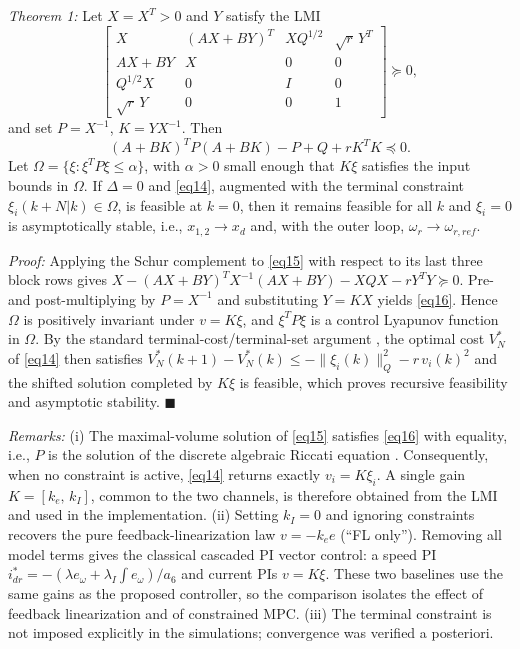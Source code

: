\documentclass[conference]{IEEEtran}
\begin{document}
\textit{Theorem 1:} Let $X=X^T>0$ and $Y$ satisfy the LMI
\begin{equation}
\begin{bmatrix}
X & (AX+BY)^T & XQ^{1/2} & \sqrt r\,Y^T\\
AX+BY & X & 0 & 0\\
Q^{1/2}X & 0 & I & 0\\
\sqrt r\,Y & 0 & 0 & 1
\end{bmatrix}\succeq 0,
\label{eq15}
\end{equation}
and set $P=X^{-1}$, $K=YX^{-1}$. Then
\begin{equation}
(A+BK)^TP(A+BK)-P+Q+rK^TK\preceq 0 .
\label{eq16}
\end{equation}
Let $\Omega=\{\xi:\xi^TP\xi\le\alpha\}$, with $\alpha>0$ small enough that $K\xi$ satisfies the input bounds in $\Omega$. If $\Delta=0$ and \eqref{eq14}, augmented with the terminal constraint $\xi_i(k+N|k)\in\Omega$, is feasible at $k=0$, then it remains feasible for all $k$ and $\xi_i=0$ is asymptotically stable, i.e., $x_{1,2}\to x_d$ and, with the outer loop, $\omega_r\to\omega_{r,ref}$.

\textit{Proof:} Applying the Schur complement to \eqref{eq15} with respect to its last three block rows gives $X-(AX+BY)^TX^{-1}(AX+BY)-XQX-rY^TY\succeq0$. Pre- and post-multiplying by $P=X^{-1}$ and substituting $Y=KX$ yields \eqref{eq16}. Hence $\Omega$ is positively invariant under $v=K\xi$, and $\xi^TP\xi$ is a control Lyapunov function in $\Omega$. By the standard terminal-cost/terminal-set argument \cite{r39}, the optimal cost $V_N^\ast$ of \eqref{eq14} then satisfies $V_N^\ast(k+1)-V_N^\ast(k)\le-\|\xi_i(k)\|_Q^2-r\,v_i(k)^2$ and the shifted solution completed by $K\xi$ is feasible, which proves recursive feasibility and asymptotic stability. \hfill$\blacksquare$

\textit{Remarks:} (i) The maximal-volume solution of \eqref{eq15} satisfies \eqref{eq16} with equality, i.e., $P$ is the solution of the discrete algebraic Riccati equation \cite{r40}. Consequently, when no constraint is active, \eqref{eq14} returns exactly $v_i=K\xi_i$. A single gain $K=[k_e,\,k_I]$, common to the two channels, is therefore obtained from the LMI and used in the implementation. (ii) Setting $k_I=0$ and ignoring constraints recovers the pure feedback-linearization law $v=-k_e e$ (``FL only''). Removing all model terms gives the classical cascaded PI vector control: a speed PI $i^\ast_{dr}=-(\lambda e_\omega+\lambda_I\!\int\! e_\omega)/a_6$ and current PIs $v=K\xi$. These two baselines use the same gains as the proposed controller, so the comparison isolates the effect of feedback linearization and of constrained MPC. (iii) The terminal constraint is not imposed explicitly in the simulations; convergence was verified a posteriori.
\end{document}
